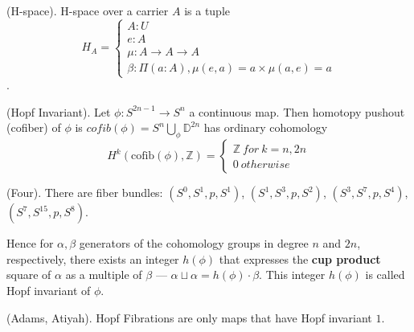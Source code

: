 \documentclass{article}
\begin{document}
\begin{definition} (H-space).
H-space over a carrier $A$ is a tuple
$$
H_A=
\begin{cases}
A : U\\
e : A\\
\mu : A \rightarrow A \rightarrow A\\
\beta : \Pi (a:A), \mu(e,a)=a \times \mu(a,e)=a
\end{cases}
$$.
\end{definition}

\newpage
\begin{theorem} (Hopf Invariant).
Let $\phi: S^{2n-1} \rightarrow S^{n}$ a continuous map.
Then homotopy pushout (cofiber) of $\phi$ is
$cofib(\phi) = S^{n} \bigcup_\phi \mathbb{D}^{2n}$ has
ordinary cohomology
$$
H^{k}(\text{cofib}(\phi),\mathbb{Z})=
\begin{cases}
\mathbb{Z}\ for\ k=n,2n \\[2ex]
0\ otherwise
\end{cases}
$$
\end{theorem}


\begin{theorem} (Four).
There are fiber bundles:
$(S^0,S^1,p,S^1)$,
$(S^1,S^3,p,S^2)$,
$(S^3,S^7,p,S^4)$,
$(S^7,S^{15},p,S^8)$.
\end{theorem}

Hence for $\alpha,\beta$ generators of the cohomology groups in
degree $n$ and $2n$, respectively, there exists an integer $h(\phi)$
that expresses the {\textbf{cup product}} square of $\alpha$
as a multiple of $\beta$ --- $\alpha\sqcup\alpha=h(\phi)\cdot\beta$.
This integer $h(\phi)$ is called Hopf invariant of $\phi$.

\begin{theorem} (Adams, Atiyah).
Hopf Fibrations are only maps that have Hopf invariant $1$.
\end{theorem}




\end{document}
